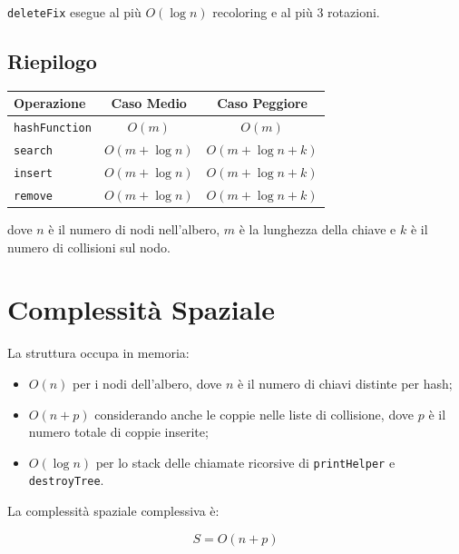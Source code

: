 \texttt{deleteFix} esegue al più $O(\log n)$ recoloring e al più 3 rotazioni.

\subsection{Riepilogo}

\begin{center}
\begin{tabular}{|l|c|c|}
\hline
\textbf{Operazione} & \textbf{Caso Medio} & \textbf{Caso Peggiore} \\
\hline
\texttt{hashFunction} & $O(m)$ & $O(m)$ \\
\hline
\texttt{search}       & $O(m + \log n)$ & $O(m + \log n + k)$ \\
\hline
\texttt{insert}       & $O(m + \log n)$ & $O(m + \log n + k)$ \\
\hline
\texttt{remove}       & $O(m + \log n)$ & $O(m + \log n + k)$ \\
\hline
\end{tabular}
\end{center}

\vspace{0.5cm}
dove $n$ è il numero di nodi nell'albero, $m$ è la lunghezza della chiave 
e $k$ è il numero di collisioni sul nodo.

\section{Complessità Spaziale}

La struttura occupa in memoria:

\begin{itemize}
    \item $O(n)$ per i nodi dell'albero, dove $n$ è il numero di chiavi 
    distinte per hash;
    \item $O(n + p)$ considerando anche le coppie nelle liste di collisione, 
    dove $p$ è il numero totale di coppie inserite;
    \item $O(\log n)$ per lo stack delle chiamate ricorsive di 
    \texttt{printHelper} e \texttt{destroyTree}.
\end{itemize}

La complessità spaziale complessiva è:

\begin{equation}
    S = O(n + p)
\end{equation}